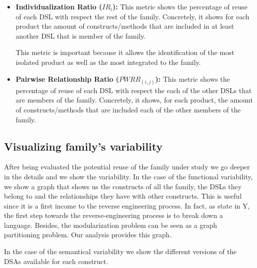 \begin{itemize}
\vspace{2mm}
\item \textbf{Individualization Ratio ($IR_i$):}
This metric shows the percentage of reuse of each DSL with respect the rest of the family. Concretely, it shows for each product the amount of constructs/methods that are included in at least another DSL that is member of the family.

\hspace{3mm} This metric is important because it allows the identification of the most isolated product as well as the most integrated to the family.

\vspace{2mm}
\item \textbf{Pairwise Relationship Ratio ($PWRR_{(i,j)}$):} 
This metric shows the percentage of reuse of each DSL with respect the each of the other DSLs that are members of the family. Concretely, it shows, for each product, the amount of constructs/methods that are included each of the other members of the family.
\end{itemize}

\subsection{Visualizing family's variability}

After being evaluated the potential reuse of the family under study we go deeper in the details and we show the variability. In the case of the functional variability, we show a graph that shows us the constructs of all the family, the DSLs they belong to and the relationships they have with other constructs. This is useful since it is a first income to the reverse engineering process. In fact, as state in Y, the first step towards the reverse-engineering process is to break down a language. Besides, the modularization problem can be seen as a graph partitioning problem. Our analysis provides this graph. 

In the case of the semantical variability we show the different versions of the DSAs available for each construct.

